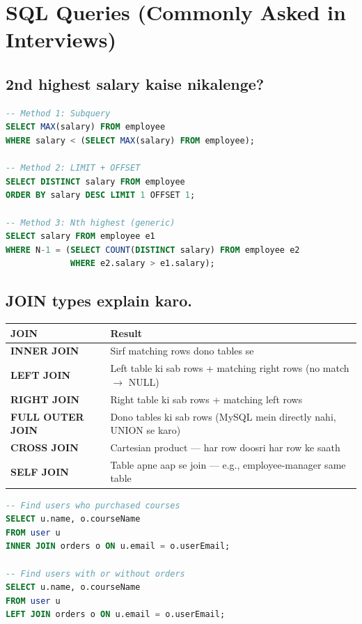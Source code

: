 \documentclass[12pt,a4paper]{article}
\begin{document}
\section{SQL Queries (Commonly Asked in Interviews)}

\setcounter{subsection}{73}

\subsection{2nd highest salary kaise nikalenge?}

\begin{answerbox}
\begin{lstlisting}[language=SQL]
-- Method 1: Subquery
SELECT MAX(salary) FROM employee
WHERE salary < (SELECT MAX(salary) FROM employee);

-- Method 2: LIMIT + OFFSET
SELECT DISTINCT salary FROM employee
ORDER BY salary DESC LIMIT 1 OFFSET 1;

-- Method 3: Nth highest (generic)
SELECT salary FROM employee e1
WHERE N-1 = (SELECT COUNT(DISTINCT salary) FROM employee e2
             WHERE e2.salary > e1.salary);
\end{lstlisting}
\end{answerbox}

\subsection{JOIN types explain karo.}

\begin{answerbox}
\begin{center}
\begin{tabular}{l p{8cm}}
\toprule
\textbf{JOIN} & \textbf{Result} \\
\midrule
\textbf{INNER JOIN} & Sirf matching rows dono tables se \\
\textbf{LEFT JOIN} & Left table ki sab rows + matching right rows (no match $\rightarrow$ NULL) \\
\textbf{RIGHT JOIN} & Right table ki sab rows + matching left rows \\
\textbf{FULL OUTER JOIN} & Dono tables ki sab rows (MySQL mein directly nahi, UNION se karo) \\
\textbf{CROSS JOIN} & Cartesian product --- har row doosri har row ke saath \\
\textbf{SELF JOIN} & Table apne aap se join --- e.g., employee-manager same table \\
\bottomrule
\end{tabular}
\end{center}
\begin{lstlisting}[language=SQL]
-- Find users who purchased courses
SELECT u.name, o.courseName 
FROM user u 
INNER JOIN orders o ON u.email = o.userEmail;

-- Find users with or without orders
SELECT u.name, o.courseName 
FROM user u 
LEFT JOIN orders o ON u.email = o.userEmail;
\end{lstlisting}
\end{answerbox}
\end{document}
